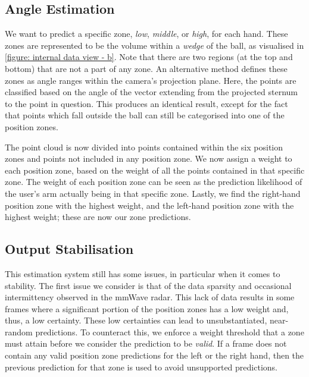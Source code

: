 \subsection{Angle Estimation}
\label{sub-section: tracking method - data interpretation - angle estimation}

We want to predict a specific zone, \textit{low}, \textit{middle}, or \textit{high}, for each hand.
These zones are represented to be the volume within a \textit{wedge} of the ball, as visualised in \cref{figure: internal data view - b}. 
Note that there are two regions (at the top and bottom) that are not a part of any zone.
An alternative method defines these zones as angle ranges within the camera's projection plane. 
Here, the points are classified based on the angle of the vector extending from the projected sternum to the point in question.
This produces an identical result, except for the fact that points which fall outside the ball can still be categorised into one of the position zones.

The point cloud is now divided into points contained within the six position zones and points not included in any position zone.
We now assign a weight to each position zone, based on the weight of all the points contained in that specific zone.
The weight of each position zone can be seen as the prediction likelihood of the user's arm actually being in that specific zone.
Lastly, we find the right-hand position zone with the highest weight, and the left-hand position zone with the highest weight; these are now our zone predictions.



\subsection{Output Stabilisation}
\label{sub-section: tracking method - data interpretation - stabilisation}

This estimation system still has some issues, in particular when it comes to stability.
The first issue we consider is that of the data sparsity and occasional intermittency observed in the mmWave radar.
This lack of data results in some frames where a significant portion of the position zones has a low weight and, thus, a low certainty.
These low certainties can lead to unsubstantiated, near-random predictions.
To counteract this, we enforce a weight threshold that a zone must attain before we consider the prediction to be \textit{valid}.
If a frame does not contain any valid position zone predictions for the left or the right hand, then the previous prediction for that zone is used to avoid unsupported predictions.


